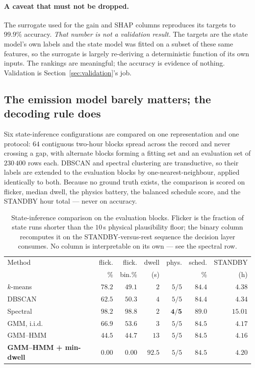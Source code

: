 \paragraph{A caveat that must not be dropped.}
The surrogate used for the gain and SHAP columns reproduces its targets
to $99.9\%$ accuracy. \emph{That number is not a validation result.} The
targets are the state model's own labels and the state model was fitted
on a subset of these same features, so the surrogate is largely
re-deriving a deterministic function of its own inputs. The rankings are
meaningful; the accuracy is evidence of nothing. Validation is
Section~\ref{sec:validation}'s job.

\subsection{The emission model barely matters; the decoding rule does}
\label{sec:results:task4}

Six state-inference configurations are compared on one representation
and one protocol: $64$ contiguous two-hour blocks spread across the
record and never crossing a gap, with alternate blocks forming a fitting
set and an evaluation set of $230\,400$ rows each. DBSCAN and spectral
clustering are transductive, so their labels are extended to the
evaluation blocks by one-nearest-neighbour, applied identically to both.
Because no ground truth exists, the comparison is scored on flicker,
median dwell, the physics battery, the balanced schedule score, and the
STANDBY hour total --- never on accuracy.

\begin{table}[t]
\centering
\caption{State-inference comparison on the evaluation blocks. Flicker is
the fraction of state runs shorter than the $10$\,s physical
plausibility floor; the binary column recomputes it on the
STANDBY-versus-rest sequence the decision layer consumes. No column is
interpretable on its own --- see the spectral row.}
\label{tab:state-detection}
\small
\setlength{\tabcolsep}{4pt}
\begin{tabular}{@{}lrrrrrr@{}}
\toprule
Method & flick. & flick. & dwell & phys. & sched. & STANDBY \\
       & \%     & bin.\% & (s)   &       & \%      & (h) \\
\midrule
$k$-means \cite{lloyd1982least}      & $78.2$ & $49.1$ & $2$ & $5/5$ & $84.4$ & $4.38$ \\
DBSCAN \cite{ester1996dbscan}        & $62.5$ & $50.3$ & $4$ & $5/5$ & $84.4$ & $4.34$ \\
Spectral \cite{ng2001spectral}       & $98.2$ & $98.8$ & $2$ & $\mathbf{4/5}$ & $\mathbf{89.0}$ & $\mathbf{15.01}$ \\
GMM, i.i.d.\ \cite{mclachlan2000finite} & $66.9$ & $53.6$ & $3$ & $5/5$ & $84.5$ & $4.17$ \\
GMM--HMM \cite{rabiner1989tutorial}  & $44.5$ & $44.7$ & $13$ & $5/5$ & $84.5$ & $4.16$ \\
\textbf{GMM--HMM + min-dwell}        & $\mathbf{0.00}$ & $\mathbf{0.00}$ & $\mathbf{92.5}$ & $5/5$ & $84.5$ & $4.20$ \\
\bottomrule
\end{tabular}
\end{table}

